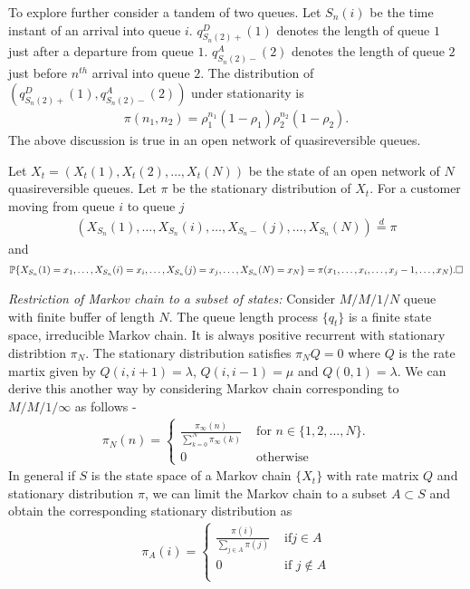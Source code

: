 \documentclass[all-lectures.tex]{subfiles}
\newcommand*{\QEDB}{\hfill\ensuremath{\square}}%
\begin{document}
To explore further consider a tandem of two queues. Let $S_n(i)$ be the time instant of an arrival into queue $i$. $q_{S_n(2)+}^D(1)$ denotes the length of queue $1$ just after a departure from queue $1$. $q_{S_n(2)-}^A(2)$ denotes the length of queue $2$ just before $n^{th}$ arrival into queue $2$. The distribution of $(q_{S_n(2)+}^D(1),q_{S_n(2)-}^A(2))$ under stationarity is 
\begin{align*}
\pi(n_1,n_2) = \rho_1^{n_1} (1-\rho_1) \rho_2^{n_2} (1-\rho_2).
\end{align*}
The above discussion is true in an open network of quasireversible queues. 
\begin{thm}
Let $X_t = (X_t(1),X_t(2),\dots,X_t(N))$ be the state of an open network of $N$ quasireversible queues. Let $\pi$ be the stationary distribution of $X_t$. For a customer moving from queue $i$ to queue $j$
\begin{align*}
(X_{S_n}(1),\dots,X_{S_n}(i),\dots,X_{S_n-}(j),\dots,X_{S_n}(N)) \stackrel{d}{=} \pi
\end{align*}
and
\begin{align*}
\P\{X_{S_n}(1)=x_1,\dots,X_{S_n}(i)=x_i,\dots,X_{S_n}(j) =x_j,\dots,X_{S_n}(N)=x_N\} 
= \pi(x_1,\dots,x_i,\dots,x_j -1,\dots,x_N). \QEDB
\end{align*}
\end{thm}

\textit{Restriction of Markov chain to a subset of states:} Consider $M/M/1/N$ queue with finite buffer of length $N$. The queue length process $\{q_t\}$ is a finite state space, irreducible Markov chain. It is always positive recurrent with stationary distribtion $\pi_N$. The stationary distribution satisfies $\pi_N Q = 0$ where $Q$ is the rate martix given by $Q(i,i+1) = \lambda$, $Q(i,i-1) = \mu$ and $Q(0,1) = \lambda$. We can derive this another way by considering Markov chain corresponding to $M/M/1/\infty$ as follows -
\begin{align*}
\pi_{N}(n) = \begin{cases}
	\frac{\pi_{\infty}(n)}{\sum_{k=0}^{N} \pi_{\infty}(k)} & \text{ for } n \in \{1,2,\dots,N\}. \\
	0 & \text{ otherwise}
	\end{cases}
\end{align*}
In general if $S$ is the state space of a Markov chain $\{X_t\}$ with rate matrix $Q$ and stationary distribution $\pi$, we can limit the Markov chain to a subset $A \subset S$ and obtain the corresponding stationary distribution as 
\begin{align*}
\pi_A(i) = \begin{cases} 
			\frac{\pi(i)}{\sum_{j \in A} \pi(j)} & \text{ if} j \in A \\
			0 & \text{ if } j \notin A \\
			\end{cases}
\end{align*}
\end{document}

